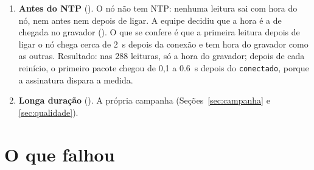 \begin{enumerate}[label=\alph*)]
    faria o \emph{broker} guardar o atraso; no BLE não há quem guarde. O
    esperado, por projeto, é uma lacuna no CSV, a sequência mostrando as
    leituras que o nó fez sem ninguém ouvindo e o primeiro pacote da volta
    trazendo a luz do intervalo. É um teste que \emph{falha} contra o
    critério da disciplina (\enquote{sem buraco no CSV}), e a falha é a
    consequência assumida na . Resultado: lacuna de
    35\,min\,39\,s, com 7 leituras que o nó fez sem ninguém ouvindo (seq 4
    a 10); o primeiro pacote da volta trouxe \SI{16240}{lux\cdot\minute}
    novos em \SI{35.6}{\minute}, média de \SI{456}{lux}, coerente com os
    569 e \SI{419}{lux} medidos antes e depois. A primeira tentativa, com
    o gravador num script, falhou: o \texttt{kill -INT} foi ignorado
    (ver \enquote{O que falhou}).
  \item \textbf{Antes do NTP} (). O nó não tem NTP: nenhuma leitura
    sai com hora do nó, nem antes nem depois de ligar. A equipe decidiu
    que a hora é a de chegada no gravador (). O que se confere é que
    a primeira leitura depois de ligar o nó chega cerca de \SI{2}{\second}
    depois da conexão e tem hora do gravador como as outras. Resultado: nas 288
    leituras, só a hora do gravador; depois de cada reinício, o primeiro
    pacote chegou de 0,1 a \SI{0.6}{\second} depois do \texttt{conectado},
    porque a assinatura dispara a medida.
  \item \textbf{Longa duração} (). A própria campanha
    (Seções~\ref{sec:campanha} e \ref{sec:qualidade}).
\end{enumerate}

\section{O que falhou}

